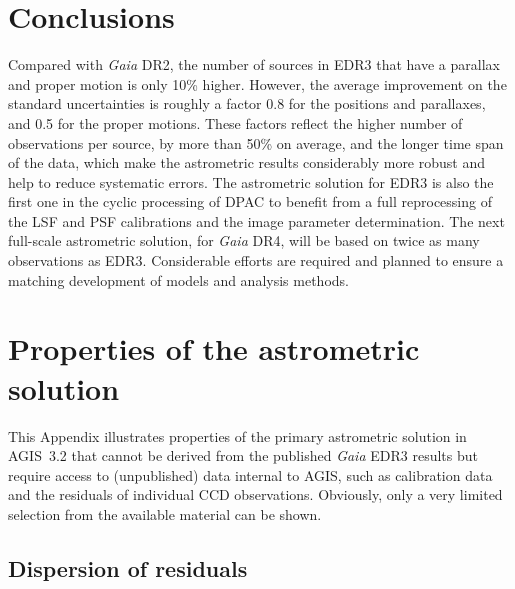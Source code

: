 \documentclass[longauth]{aa} %
\begin{document}
\section{Conclusions}
\label{sec:concl}

Compared with \textit{Gaia} DR2, the number of sources in EDR3 that have
a parallax and proper motion is only 10\% higher. However, the average improvement 
on the standard uncertainties is roughly a factor 0.8 for the positions and parallaxes, 
and 0.5 for the proper motions. These factors reflect the higher number of observations
per source, by more than 50\% on average, and the longer time span of the data, which 
make the astrometric results 
considerably more robust and help to reduce systematic errors. The astrometric solution 
for EDR3 is also the
first one in the cyclic processing of DPAC to benefit from a full reprocessing of
the LSF and PSF calibrations and the image parameter determination. 
The next full-scale astrometric solution, for \textit{Gaia} DR4,
will be based on twice as many observations as EDR3. Considerable efforts are required
and planned to ensure a matching development of models and analysis methods. 





\appendix




\section{Properties of the astrometric solution}
\label{sec:propSol}

This Appendix illustrates properties of the primary astrometric solution in AGIS~3.2 that 
cannot be derived from the published \textit{Gaia} EDR3 results but require access
to (unpublished) data internal to AGIS, such as calibration data and the residuals of 
individual CCD observations. Obviously, only a very limited selection from the available 
material can be shown.


\subsection{Dispersion of residuals}
\label{sec:resid}
\end{document}
